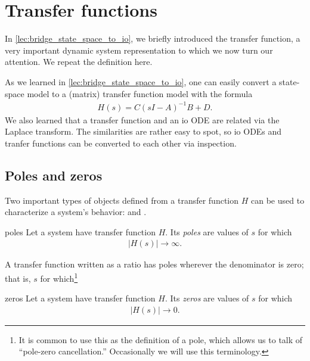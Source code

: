 \documentclass[dynamic_systems.tex]{subfiles}
\begin{document}
\chapter{Transfer functions}
\tags{}

In \cref{lec:bridge_state_space_to_io}, we briefly introduced the transfer function, a very important dynamic system representation to which we now turn our attention. 
We repeat the definition here.
\tags{}



As we learned in \cref{lec:bridge_state_space_to_io}, one can easily convert a state-space model to a (matrix) transfer function model with the formula
\begin{align}
H(s) = C (s I - A)^{-1} B + D.
\end{align}
We also learned that a transfer function and an io ODE are related via the Laplace transform.
The similarities are rather easy to spot, so io ODEs and tranfer functions can be converted to each other via inspection.
\tags{}

\section{Poles and zeros}
\tags{}

Two important types of objects defined from a transfer function $H$ can be used to characterize a system's behavior:  and .
\tags{}

\begin{Definition}{poles}{}
Let a system have transfer function $H$.
Its \emph{poles} are values of $s$ for which
\begin{align*}
	|H(s)| \rightarrow \infty.
\end{align*}
\end{Definition}

A transfer function written as a ratio has poles wherever the denominator is zero; that is, $s$ for which\footnote{It is common to use this as the definition of a pole, which allows us to talk of ``pole-zero cancellation.'' Occasionally we will use this terminology.}

\begin{Definition}{zeros}{}
Let a system have transfer function $H$.
Its \emph{zeros} are values of $s$ for which
\begin{align*}
	|H(s)| \rightarrow 0.
\end{align*}
\end{Definition}
\end{document}

